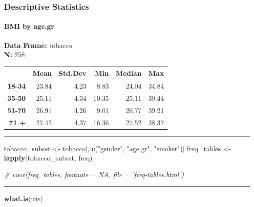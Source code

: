 \documentclass[]{article}
\newenvironment{Shaded}{\begin{snugshade}}{\end{snugshade}}
\newcommand{\CommentTok}[1]{\textcolor[rgb]{0.56,0.35,0.01}{\textit{#1}}}
\newcommand{\KeywordTok}[1]{\textcolor[rgb]{0.13,0.29,0.53}{\textbf{#1}}}
\newcommand{\NormalTok}[1]{#1}
\newcommand{\StringTok}[1]{\textcolor[rgb]{0.31,0.60,0.02}{#1}}
\let\oldparagraph\paragraph
\renewcommand{\paragraph}[1]{\oldparagraph{#1}\mbox{}}
\begin{document}
\hypertarget{descriptive-statistics-3}{%
\subsubsection{Descriptive Statistics}\label{descriptive-statistics-3}}

\hypertarget{bmi-by-age.gr-1}{%
\paragraph{BMI by age.gr}\label{bmi-by-age.gr-1}}

\textbf{Data Frame:} tobacco\\
\textbf{N:} 258

\begin{longtable}[]{@{}rrrrrr@{}}
\toprule
~ & Mean & Std.Dev & Min & Median & Max\tabularnewline
\midrule
\endhead
\textbf{18-34} & 23.84 & 4.23 & 8.83 & 24.04 & 34.84\tabularnewline
\textbf{35-50} & 25.11 & 4.34 & 10.35 & 25.11 & 39.44\tabularnewline
\textbf{51-70} & 26.91 & 4.26 & 9.01 & 26.77 & 39.21\tabularnewline
\textbf{71 +} & 27.45 & 4.37 & 16.36 & 27.52 & 38.37\tabularnewline
\bottomrule
\end{longtable}

\begin{center}\rule{0.5\linewidth}{\linethickness}\end{center}

\begin{Shaded}
\begin{Highlighting}[]
\NormalTok{tobacco_subset <-}\StringTok{ }\NormalTok{tobacco[, }\KeywordTok{c}\NormalTok{(}\StringTok{"gender"}\NormalTok{, }\StringTok{"age.gr"}\NormalTok{, }\StringTok{"smoker"}\NormalTok{)]}
\NormalTok{freq_tables <-}\StringTok{ }\KeywordTok{lapply}\NormalTok{(tobacco_subset, freq)}

\CommentTok{# view(freq_tables, footnote = NA, file = 'freq-tables.html')}
\end{Highlighting}
\end{Shaded}

\begin{center}\rule{0.5\linewidth}{\linethickness}\end{center}

\begin{Shaded}
\begin{Highlighting}[]
\KeywordTok{what.is}\NormalTok{(iris)}
\end{Highlighting}
\end{Shaded}
\end{document}
